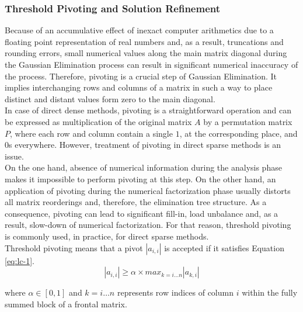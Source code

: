 \subsubsection{Threshold Pivoting and Solution Refinement}
\label{subseq:pivot-hadling}


Because of an accumulative effect of inexact computer arithmetics due to a floating point representation of real numbers and, as a result, truncations and rounding errors, small numerical values along the main matrix diagonal during the Gaussian Elimination process can result in significant numerical inaccuracy of the process. Therefore, pivoting is a crucial step of Gaussian Elimination. It implies interchanging rows and columns of a matrix in such a way to place distinct and distant values form zero to the main diagonal.\\


In case of direct dense methods, pivoting is a straightforward operation and can be expressed as multiplication of the original matrix $A$ by a permutation matrix $P$, where each row and column contain a single $1$, at the corresponding place, and $0$s everywhere. However, treatment of pivoting in direct sparse methods is an issue.\\


On the one hand, absence of numerical information during the analysis phase makes it impossible to perform pivoting at this step. On the other hand, an application of pivoting during the numerical factorization phase usually distorts all matrix reorderings and, therefore, the elimination tree structure. As a consequence, pivoting can lead to significant fill-in, load unbalance and, as a result, slow-down of numerical factorization. For that reason, threshold pivoting is commonly used, in practice, for direct sparse methods.\\


Threshold pivoting means that a pivot $|a_{i,i}|$ is accepted if it satisfies Equation \ref{eq:lc-1}.\\
\begin{equation}\label{eq:lc-1}
|a_{i,i}| \geq \alpha \times max_{k=i \dots n} |a_{k,i}|
\end{equation}

where $\alpha \in [0,1]$ and $k=i \dots n$ represents row indices of column $i$ within the fully summed block of a frontal matrix.\\

